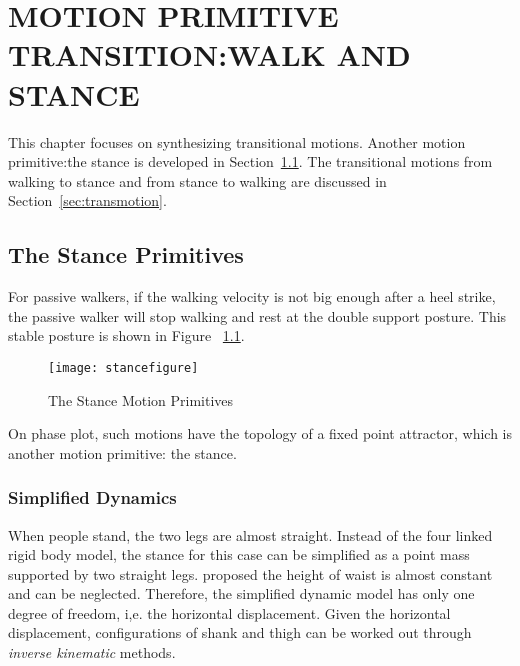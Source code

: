 
\chapter{MOTION PRIMITIVE TRANSITION:WALK AND STANCE}
\label{chap:stance}
    \graphicspath{{WalkStance/WalkStanceFigs/EPS/}{WalkStance/WalkStanceFigs/}}

This chapter focuses on synthesizing transitional motions.
Another motion primitive:the stance is developed in Section~\ref{sec:stanceprimitive}.
The transitional motions from walking to stance and from stance to walking are discussed in Section~\ref{sec:transmotion}.




    
    




\section{The Stance Primitives}
\label{sec:stanceprimitive}
For passive walkers, if the walking velocity is not big enough after a  heel strike, the passive walker will stop walking and rest at the double support posture.
This stable posture is shown in Figure ~\ref{fig:bipedalstance}.
\begin{figure}[!htbp]
  \begin{center}
     \texttt{[image: stancefigure]}
    \caption{The Stance Motion Primitives}
    \label{fig:bipedalstance}
\end{center}
\end{figure}

On phase plot, such motions have the topology of a fixed point attractor, which is  another motion primitive: the stance. 



\subsection{Simplified Dynamics}
When people stand, the two legs are almost straight.
Instead of the four linked rigid body model, the stance for this case can be simplified as a point mass supported by two straight legs. 
\citet{stephens2009modeling} proposed the height of waist is almost constant and can be neglected.
Therefore, the simplified dynamic model has only one degree of freedom, i,e. the horizontal displacement.
Given the horizontal displacement, configurations of shank and thigh can be worked out through \emph{inverse kinematic} methods.
 




